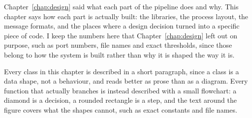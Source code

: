 \label{chap:implementation}


Chapter~\ref{chap:design} said what each part of the pipeline does and why.
This chapter says how each part is actually built: the libraries, the process
layout, the message formats, and the places where a design decision turned
into a specific piece of code. I keep the numbers here that
Chapter~\ref{chap:design} left out on purpose, such as port numbers, file
names and exact thresholds, since those belong to how the system is built
rather than why it is shaped the way it is.

Every class in this chapter is described in a short paragraph, since a class
is a data shape, not a behaviour, and reads better as prose than as a
diagram. Every function that actually branches is instead described with a
small flowchart: a diamond is a decision, a rounded rectangle is a step, and
the text around the figure covers what the shapes cannot, such as exact
constants and file names.

